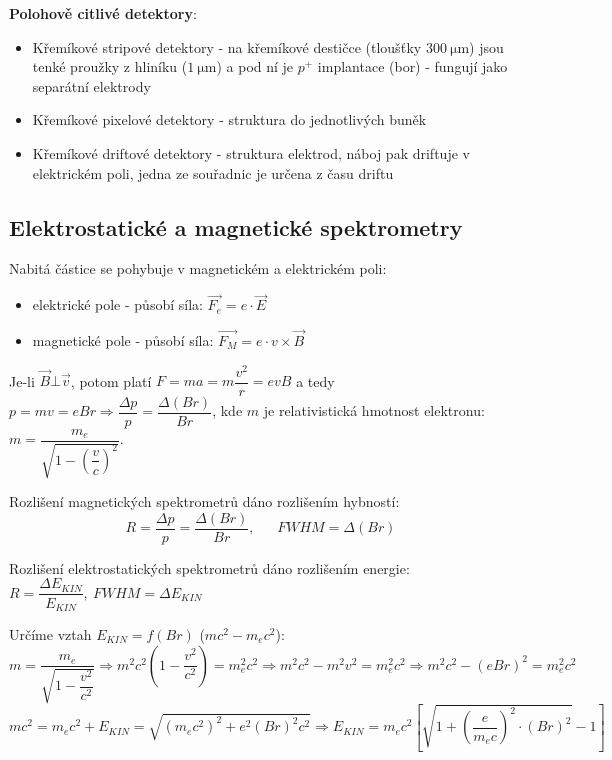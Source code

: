 \documentclass[../../main.tex]{subfiles}
\begin{document}
\textbf{Polohově citlivé detektory}:
\begin{itemize}
	\item Křemíkové stripové detektory - na křemíkové destičce (tloušťky $300 ~\mathrm{\mu m}$) jsou tenké proužky z hliníku ($1 ~\mathrm{\mu m}$) a pod ní je $p^+$ implantace (bor) - fungují jako  separátní elektrody
	\item Křemíkové pixelové detektory - struktura do jednotlivých buněk
	\item Křemíkové driftové detektory - struktura elektrod, náboj pak driftuje v elektrickém poli, jedna ze souřadnic je určena z času driftu
\end{itemize}
	
\subsection{Elektrostatické a magnetické spektrometry}

Nabitá částice se pohybuje v magnetickém a elektrickém poli:
\begin{itemize}
	\item elektrické pole - působí síla: $\overrightarrow{F_e} = e \cdotp \overrightarrow{E}$
	\item magnetické pole - působí síla: $\overrightarrow{F_M} = e \cdotp v \times \overrightarrow{B}$
\end{itemize}

Je-li $\overrightarrow{B} \bot \overrightarrow{v}$, potom platí $F = ma = m \dfrac{v^2}{r} = e v B$ a tedy $p = mv = eBr \Rightarrow \dfrac{\Delta p}{p} = \dfrac{\Delta (Br)}{Br}$, kde $m$ je relativistická hmotnost elektronu: $m = \dfrac{m_e}{\sqrt{1 - \left( \dfrac{v}{c}\right)^2 }}$.

Rozlišení magnetických spektrometrů dáno rozlišením hybností:
\begin{equation}
R = \dfrac{\Delta p}{p} = \dfrac{\Delta (Br)}{Br}, ~~~~~~~ FWHM = \Delta (Br)
\end{equation}

Rozlišení elektrostatických spektrometrů dáno rozlišením energie: $R = \dfrac{\Delta E_{KIN}}{E_{KIN}}, ~ FWHM = \Delta E_{KIN}$

Určíme vztah $E_{KIN} = f(Br)$ ($mc^2 - m_e c^2$):
\begin{equation}
m = \dfrac{m_e}{\sqrt{1 - \dfrac{v^2}{c^2}}} \Rightarrow m^2 c^2 \left( 1 - \dfrac{v^2}{c^2}\right) = m_{e}^2 c^2 \Rightarrow m^2 c^2 - m^2 v^2 = m_{e}^2 c^2 \Rightarrow m^2 c^2 - (e B r)^2 = m_{e}^2 c^2
\end{equation}
\begin{equation}
mc^2 = m_e c^2 + E_{KIN} = \sqrt{(m_e c^2)^2 + e^2 (Br)^2c^2} \Rightarrow E_{KIN} = m_e c^2 \left[ \sqrt{1 + \left( \dfrac{e}{m_e c}\right)^2 \cdotp (Br)^2 } - 1\right] 
\end{equation}
\end{document}
